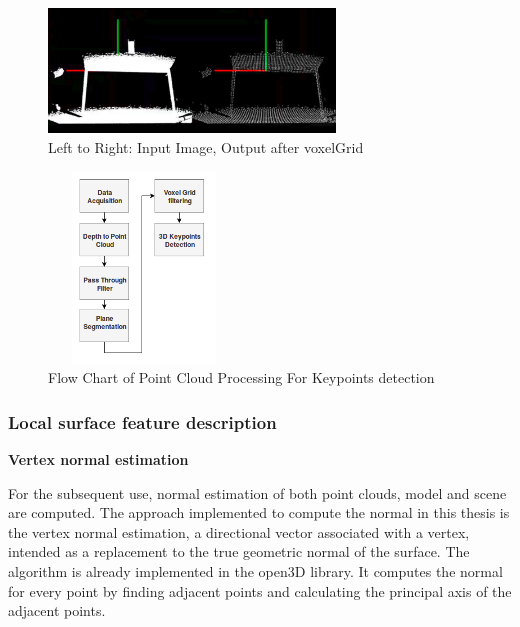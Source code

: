 \begin{figure}[!h]
\begin{center}
\includegraphics[width=3in]{figures03/voxelcloud1.png}
\caption{Left to Right: Input Image, Output after voxelGrid}%
\label{fig:voxeldown}
\end{center}
\end{figure}

\begin{figure}[!h]
\begin{center}
\includegraphics[width=2in,height=2in]{diagrams/keypoints.png}
\caption{Flow Chart of Point Cloud Processing For Keypoints detection}
\label{fig:planesegmentation}
\end{center}
\end{figure}

\subsubsection{Local surface feature description}
\textbf{Vertex normal estimation}

For the subsequent use, normal estimation of both point clouds, model and scene are computed. The approach implemented to compute the normal in this thesis is the vertex normal estimation, a directional vector associated with a vertex, intended as a replacement to the true geometric normal of the surface. The algorithm is already implemented in the open3D \cite{open3d} library. 
It computes the normal for every point by finding adjacent points and calculating the principal axis of the adjacent points.

